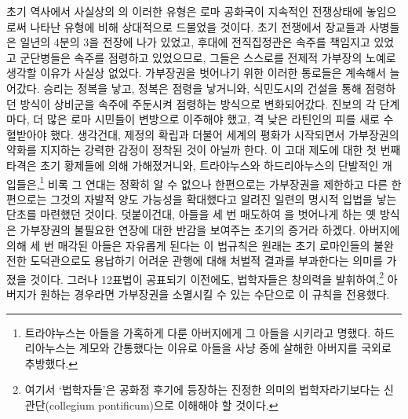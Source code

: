 초기 역사에서
사실상의 의 이러한 유형은
로마 공화국이 지속적인 전쟁상태에 놓임으로써 나타난 유형에 비해
상대적으로 드물었을 것이다.
초기 전쟁에서 장교들과 사병들은 일년의 4분의 3을 전장에 나가 있었고,
후대에 전직집정관은 속주를 책임지고 있었고
군단병들은 속주를 점령하고 있었으므로,
그들은 스스로를 전제적 가부장의 노예로 생각할 이유가 사실상 없었다.
가부장권을 벗어나기 위한 이러한 통로들은 계속해서 늘어갔다.
승리는 정복을 낳고, 정복은 점령을 낳거니와,
식민도시의 건설을 통해 점령하던 방식이
상비군을 속주에 주둔시켜 점령하는 방식으로
변화되어갔다.
진보의 각 단계마다,
더 많은 로마 시민들이 변방으로 이주해야 했고,
격 낮은 라틴인의 피를 새로 수혈받아야 했다.
생각건대,
제정의 확립과 더불어 세계의 평화가 시작되면서
가부장권의 약화를 지지하는 강력한 감정이 정착된 것이 아닐까 한다.
이 고대 제도에 대한 첫 번째 타격은 초기 황제들에 의해 가해졌거니와,
트라야누스와 하드리아누스의 단발적인 개입들은,\footnote{트라야누스는
아들을 가혹하게 다룬 아버지에게 그 아들을 시키라고 명했다.
하드리아누스는 계모와 간통했다는 이유로 아들을 사냥 중에 살해한 아버지를
국외로 추방했다.}
비록 그 연대는 정확히 알 수 없으나
한편으로는 가부장권을 제한하고
다른 한편으로는 그것의 자발적 양도 가능성을 확대했다고 알려진
일련의 명시적 입법을 낳는 단초를 마련했던 것이다.
덧붙이건대, 아들을 세 번 매도하여 을 벗어나게 하는 옛 방식은
가부장권의 불필요한 연장에 대한 반감을 보여주는
초기의 증거라 하겠다.
아버지에 의해 세 번 매각된 아들은 자유롭게 된다는 이 법규칙은
원래는
초기 로마인들의 불완전한 도덕관으로도
용납하기 어려운 관행에 대해 처벌적 결과를 부과한다는 의미를 가졌을 것이다.
그러나 12표법이 공표되기 이전에도,
법학자들은 창의력을 발휘하여,\footnote{여기서 `법학자들'은
공화정 후기에 등장하는 진정한 의미의 법학자라기보다는
신관단(collegium pontificum)으로 이해해야 할 것이다.}
아버지가 원하는 경우라면 가부장권을 소멸시킬 수 있는 수단으로
이 규칙을 전용했다.

